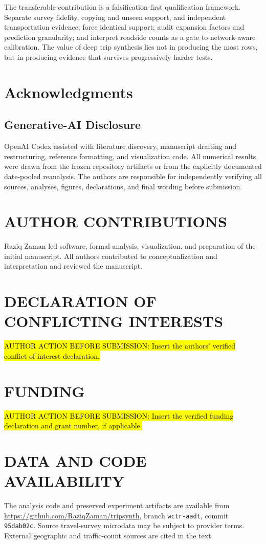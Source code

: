 \documentclass[numbered]{trbunofficial}
\begin{document}
The transferable contribution is a falsification-first qualification framework. Separate survey fidelity, copying and unseen support, and independent transportation evidence; force identical support; audit expansion factors and prediction granularity; and interpret roadside counts as a gate to network-aware calibration. The value of deep trip synthesis lies not in producing the most rows, but in producing evidence that survives progressively harder tests.

\section{Acknowledgments}

\subsection{Generative-AI Disclosure}
OpenAI Codex assisted with literature discovery, manuscript drafting and restructuring, reference formatting, and visualization code. All numerical results were drawn from the frozen repository artifacts or from the explicitly documented date-pooled reanalysis. The authors are responsible for independently verifying all sources, analyses, figures, declarations, and final wording before submission.

\section*{AUTHOR CONTRIBUTIONS}
Raziq Zaman led software, formal analysis, visualization, and preparation of the initial manuscript. All authors contributed to conceptualization and interpretation and reviewed the manuscript.

\section*{DECLARATION OF CONFLICTING INTERESTS}
\hl{AUTHOR ACTION BEFORE SUBMISSION: Insert the authors' verified conflict-of-interest declaration.}

\section*{FUNDING}
\hl{AUTHOR ACTION BEFORE SUBMISSION: Insert the verified funding declaration and grant number, if applicable.}

\section*{DATA AND CODE AVAILABILITY}
The analysis code and preserved experiment artifacts are available from \url{https://github.com/RaziqZaman/tripsynth}, branch \texttt{wctr-aadt}, commit \texttt{95dab02c}. Source travel-survey microdata may be subject to provider terms. External geographic and traffic-count sources are cited in the text.

\newpage


\end{document}

